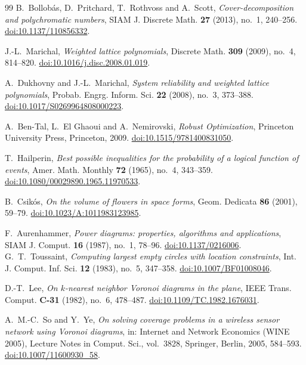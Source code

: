 \begin{thebibliography}{99}
B.~Bollob\'as, D.~Pritchard, T.~Rothvoss and A.~Scott,
\emph{Cover-decomposition and polychromatic numbers},
SIAM J. Discrete Math. \textbf{27} (2013), no.~1, 240--256.
\href{https://doi.org/10.1137/110856332}{doi:10.1137/110856332}.

J.-L.~Marichal,
\emph{Weighted lattice polynomials},
Discrete Math. \textbf{309} (2009), no.~4, 814--820.
\href{https://doi.org/10.1016/j.disc.2008.01.019}{doi:10.1016/j.disc.2008.01.019}.

A.~Dukhovny and J.-L.~Marichal,
\emph{System reliability and weighted lattice polynomials},
Probab. Engrg. Inform. Sci. \textbf{22} (2008), no.~3, 373--388.
\href{https://doi.org/10.1017/S0269964808000223}{doi:10.1017/S0269964808000223}.

A.~Ben-Tal, L.~El Ghaoui and A.~Nemirovski,
\emph{Robust Optimization},
Princeton University Press, Princeton, 2009.
\href{https://doi.org/10.1515/9781400831050}{doi:10.1515/9781400831050}.

T.~Hailperin,
\emph{Best possible inequalities for the probability of a logical function of events},
Amer. Math. Monthly \textbf{72} (1965), no.~4, 343--359.
\href{https://doi.org/10.1080/00029890.1965.11970533}{doi:10.1080/00029890.1965.11970533}.

B.~Csik\'os,
\emph{On the volume of flowers in space forms},
Geom. Dedicata \textbf{86} (2001), 59--79.
\href{https://doi.org/10.1023/A:1011983123985}{doi:10.1023/A:1011983123985}.

F.~Aurenhammer,
\emph{Power diagrams: properties, algorithms and applications},
SIAM J. Comput. \textbf{16} (1987), no.~1, 78--96.
\href{https://doi.org/10.1137/0216006}{doi:10.1137/0216006}.
G.~T.~Toussaint,
\emph{Computing largest empty circles with location constraints},
Int. J. Comput. Inf. Sci. \textbf{12} (1983), no.~5, 347--358.
\href{https://doi.org/10.1007/BF01008046}{doi:10.1007/BF01008046}.

D.-T.~Lee,
\emph{On $k$-nearest neighbor Voronoi diagrams in the plane},
IEEE Trans. Comput. \textbf{C-31} (1982), no.~6, 478--487.
\href{https://doi.org/10.1109/TC.1982.1676031}{doi:10.1109/TC.1982.1676031}.

A.~M.-C.~So and Y.~Ye,
\emph{On solving coverage problems in a wireless sensor network using Voronoi diagrams},
in: Internet and Network Economics (WINE 2005), Lecture Notes in Comput. Sci., vol.~3828, Springer, Berlin, 2005, 584--593.
\href{https://doi.org/10.1007/11600930_58}{doi:10.1007/11600930\_58}.
\end{thebibliography}
